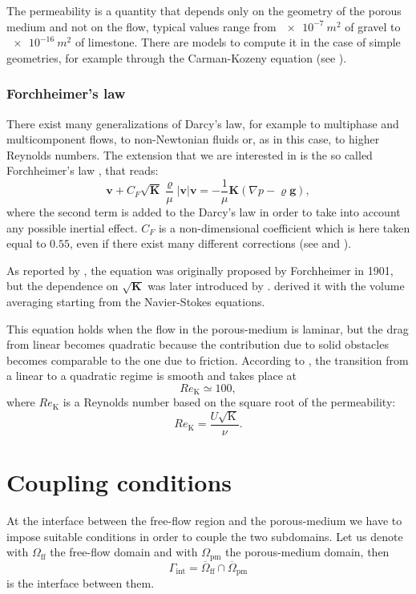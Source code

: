 The permeability is a quantity that depends only on the geometry of the porous 
medium and not on the flow, typical values range from $\SI{e-7}{m^2}$ of 
gravel to $\SI{e-16}{m^2}$ of limestone.
There are models to compute it in the case of simple geometries, for example 
through the Carman-Kozeny equation (see \cite{forch:nield}). 
%
\subsubsection{Forchheimer's law}
There exist many generalizations of Darcy's law, for example to multiphase 
and multicomponent flows, to non-Newtonian fluids or, as in this case, to 
higher Reynolds numbers. The 
extension that we are interested in is the so called Forchheimer's law \cite{forch:1901}, that reads:
\begin{equation} \label{eq:forch}
	\mathbf{v} + C_F \sqrt{\mathbf{K}} \frac{\varrho}{\mu} 
	|\mathbf{v}|\mathbf{v} = - \frac{1}{\mu} \mathbf{K}(\nabla p - \varrho 
	\mathbf{g} ),
\end{equation}
where the second term is added to the Darcy's law in order to take into account any possible inertial effect. $C_F$ is a non-dimensional coefficient which is 
here taken equal to $0.55$, even if there exist many different corrections (see 
\cite{forch:nield} and \cite{forch:tesi}).

As reported by \textcite{forch:nield}, the equation was originally proposed by 
Forchheimer in 1901, but the dependence on $\sqrt{\mathbf{K}}$ was later introduced 
by \textcite{forch:ward}. \textcite{volaver:withakerforch} 
derived it with the volume averaging  starting from the Navier-Stokes equations.

This equation holds when the flow in the porous-medium is laminar, but 
the drag from linear becomes quadratic because the contribution due to solid 
obstacles becomes comparable to the one due to friction. According to 
\cite{forch:nield}, the transition from a linear to a quadratic regime is 
smooth and takes place at
\begin{equation}
	Re_\mathrm{K} \simeq 100,
\end{equation}
where $Re_\mathrm{K}$ is a Reynolds number based on the square root of the 
permeability:
\begin{equation}
	Re_\mathrm{K} = \frac{U \sqrt{\mathrm{K}}}{\nu}.
\end{equation}
%
\section{Coupling conditions} \label{sec:coupling}
At the interface between the free-flow region and the porous-medium we have to 
impose suitable conditions in order to couple the two subdomains. Let us denote 
with $\Omega_\text{ff}$ the free-flow domain and with $\Omega_\text{pm}$ the 
porous-medium domain, then
\begin{equation}
	 \Gamma_\text{int} = \overline{\Omega}_\text{ff} \cap 
	 \overline{\Omega}_\text{pm}
\end{equation}
is the interface between them.

